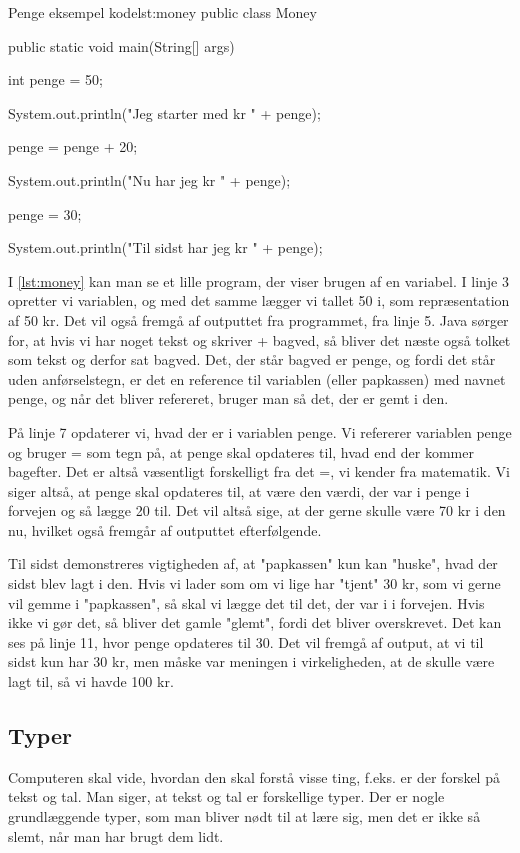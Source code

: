 {\begin{JavaCode}{Penge eksempel kode}{lst:money}
public class Money {
	public static void main(String[] args) {
		int penge = 50;
		
		System.out.println("Jeg starter med kr " + penge);
		
		penge = penge + 20;
		
		System.out.println("Nu har jeg kr " + penge);
		
		penge = 30;
		
		System.out.println("Til sidst har jeg kr " + penge);
	}
}
\end{JavaCode}

I \autoref{lst:money} kan man se et lille program, der viser brugen af en variabel. I linje 3 opretter vi variablen, og med det samme lægger vi tallet 50 i, som repræsentation af 50 kr. Det vil også fremgå af outputtet fra programmet, fra linje 5. Java sørger for, at hvis vi har noget tekst og skriver + bagved, så bliver det næste også tolket som tekst og derfor sat bagved. Det, der står bagved er penge, og fordi det står uden anførselstegn, er det en reference til variablen (eller papkassen) med navnet penge, og når det bliver refereret, bruger man så det, der er gemt i den.

På linje 7 opdaterer vi, hvad der er i variablen penge. Vi refererer variablen penge og bruger = som tegn på, at penge skal opdateres til, hvad end der kommer bagefter. Det er altså væsentligt forskelligt fra det =, vi kender fra matematik. Vi siger altså, at penge skal opdateres til, at være den værdi, der var i penge i forvejen og så lægge 20 til. Det vil altså sige, at der gerne skulle være 70 kr i den nu, hvilket også fremgår af outputtet efterfølgende.

Til sidst demonstreres vigtigheden af, at "papkassen" kun kan "huske", hvad der sidst blev lagt i den. Hvis vi lader som om vi lige har "tjent" 30 kr, som vi gerne vil gemme i "papkassen", så skal vi lægge det til det, der var i i forvejen. Hvis ikke vi gør det, så bliver det gamle "glemt", fordi det bliver overskrevet. Det kan ses på linje 11, hvor penge opdateres til 30. Det vil fremgå af output, at vi til sidst kun har 30 kr, men måske var meningen i virkeligheden, at de skulle være lagt til, så vi havde 100 kr.

\subsection{Typer}
Computeren skal vide, hvordan den skal forstå visse ting, f.eks. er der forskel på tekst og tal. Man siger, at tekst og tal er forskellige typer. Der er nogle grundlæggende typer, som man bliver nødt til at lære sig, men det er ikke så slemt, når man har brugt dem lidt.

}
